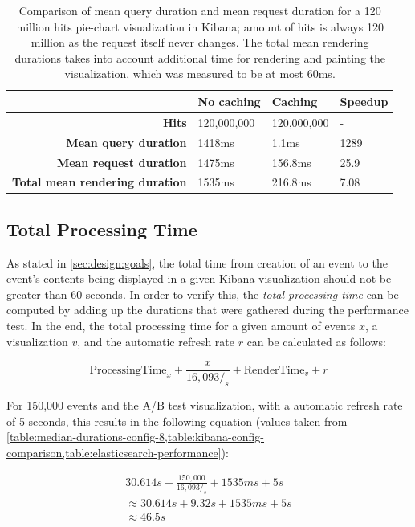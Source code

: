 \begin{table}
\caption{Comparison of mean query duration and mean request duration for a 120 million hits pie-chart visualization in Kibana; amount of hits is always 120 million as the request itself never changes. The total mean rendering durations takes into account additional time for rendering and painting the visualization, which was measured to be at most 60ms.}
\label{table:kibana-config-comparison}
\centering
\begin{tabular}{r|l|l|l}
& \textbf{No caching}                                      & \textbf{Caching} & \textbf{Speedup} \\ \hline
\textbf{Hits} & 120,000,000 & 120,000,000 & - \\ \hline
\textbf{Mean query duration} & 1418ms & 1.1ms & 1289 \\ \hline
\textbf{Mean request duration} & 1475ms & 156.8ms & 25.9 \\ \hline
\textbf{Total mean rendering duration} & 1535ms & 216.8ms & 7.08 \\

\end{tabular}
\end{table}


\subsection{Total Processing Time}
\label{subsec:evaluation:performance:total-processing-time}

As stated in \cref{sec:design:goals}, the total time from creation of an event to the event's contents being displayed in a given Kibana visualization should not be greater than 60 seconds.
In order to verify this, the \emph{total processing time} can be computed by adding up the durations that were gathered during the performance test.
In the end, the total processing time for a given amount of events $x$, a visualization $v$, and the automatic refresh rate $r$ can be calculated as follows:

$$ \text{ProcessingTime}_x + \frac{x}{16,093/_s} + \text{RenderTime}_v + r$$

For 150,000 events and the A/B test visualization, with a automatic refresh rate of 5 seconds, this results in the following equation (values taken from \cref{table:median-durations-config-8,table:kibana-config-comparison,table:elasticsearch-performance}):

\begin{align*}
30.614s + \frac{150,000}{16,093/_s} + 1535ms + 5s \\
\approx 30.614s + 9.32s + 1535ms + 5s \\
\approx 46.5s 
\end{align*}

